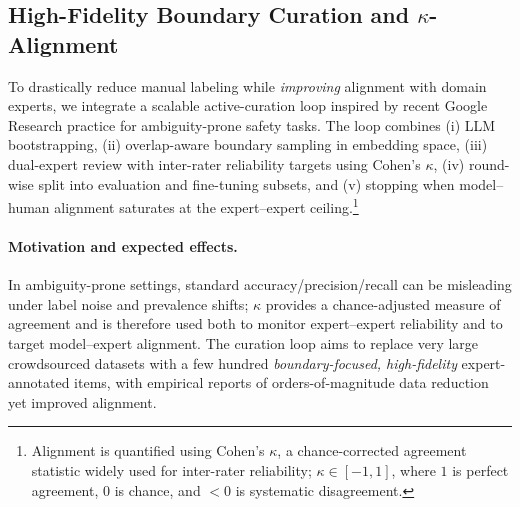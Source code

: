 \documentclass[ai,article,submit,pdftex,moreauthors]{Definitions/mdpi}
\begin{document}
\subsection{High-Fidelity Boundary Curation and $\kappa$-Alignment}\label{subsec:curation}
To drastically reduce manual labeling while \emph{improving} alignment with domain experts, we integrate a scalable active-curation loop inspired by recent Google Research practice for ambiguity-prone safety tasks. The loop combines (i) LLM bootstrapping, (ii) overlap-aware boundary sampling in embedding space, (iii) dual-expert review with inter-rater reliability targets using Cohen’s $\kappa$, (iv) round-wise split into evaluation and fine-tuning subsets, and (v) stopping when model–human alignment saturates at the expert–expert ceiling.\footnote{Alignment is quantified using Cohen’s $\kappa$, a chance-corrected agreement statistic widely used for inter-rater reliability; $\kappa\!\in\![-1,1]$, where $1$ is perfect agreement, $0$ is chance, and $<0$ is systematic disagreement.} 
%
%  
%  

\paragraph{Motivation and expected effects.}
In ambiguity-prone settings, standard accuracy/precision/recall can be misleading under label noise and prevalence shifts; $\kappa$ provides a chance-adjusted measure of agreement and is therefore used both to monitor expert–expert reliability and to target model–expert alignment. The curation loop aims to replace very large crowdsourced datasets with a few hundred \emph{boundary-focused, high-fidelity} expert-annotated items, with empirical reports of orders-of-magnitude data reduction yet improved alignment. 
%
%  
\end{document}
